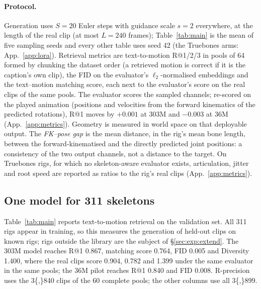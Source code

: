 \paragraph{Protocol.} Generation uses $S{=}20$ Euler steps with guidance scale $s{=}2$ everywhere, at the
length of the real clip (at most $L{=}240$ frames); Table~\ref{tab:main} is the mean of five sampling seeds and every other table uses seed 42 (the Truebones arms:
App.~\ref{app:lora}). Retrieval metrics are text-to-motion R@1/2/3 in
pools of 64 formed by chunking the dataset order (a retrieved motion is correct if it is the caption's own
clip), the FID on the evaluator's $\ell_2$-normalised embeddings and the text--motion matching score, each
next to the evaluator's score on the real clips of the same pools. The evaluator
scores the sampled channels; re-scored on the played animation (positions and velocities from the forward kinematics
of the predicted rotations), R@1 moves by $+0.001$ at \num{303}M and $-0.003$ at \num{36}M (App.~\ref{app:metrics}). Geometry is measured in world space on that
deployable output. The \emph{FK--pose gap} is the mean distance, in the rig's mean bone length, between the
forward-kinematised and the directly predicted joint positions: a consistency of the two output channels, not a
distance to the target. On Truebones rigs, for which no skeleton-aware evaluator exists, articulation, jitter and root speed
are reported as ratios to the rig's real clips (App.~\ref{app:metrics}).

\subsection{One model for 311 skeletons}\label{sec:exp:main}

Table~\ref{tab:main} reports text-to-motion retrieval on the validation set. All \num{311} rigs appear in
training, so this measures the generation of held-out clips on known rigs; rigs outside the library are
the subject of \S\ref{sec:exp:extend}. The \num{303}M model reaches R@1 \num{0.867}, matching score
\num{0.764}, FID \num{0.005} and Diversity \num{1.400}, where the real clips score \num{0.904}, \num{0.782} and
\num{1.399} under the same evaluator in the same pools; the \num{36}M pilot reaches R@1 \num{0.840} and FID
\num{0.008}. R-precision uses the \num{3{,}840} clips of the 60 complete pools; the other columns use all
\num{3{,}899}.


